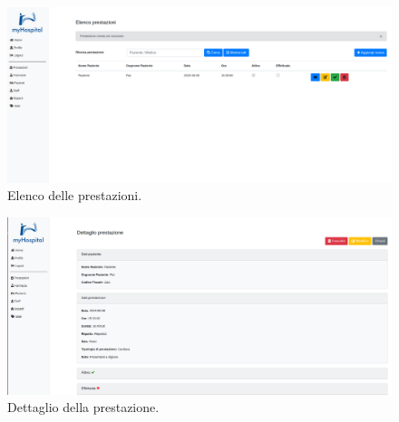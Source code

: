 \documentclass[paper=a4, fontsize=11pt,x11names]{report}
\begin{document}
\begin{landscape}
\begin{figure}[H]
\begin{center}
\includegraphics[scale=0.6]{grafica/ElencoPrestazioni}
\caption{Elenco delle prestazioni.}
\end{center}
\end{figure}
\end{landscape}

\begin{landscape}
\begin{figure}[H]
\begin{center}
\includegraphics[scale=0.6]{grafica/DettaglioPrestazione}
\caption{Dettaglio della prestazione.}
\end{center}
\end{figure}
\end{landscape}



\end{document}

